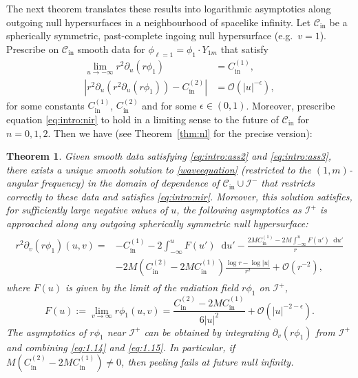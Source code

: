 \documentclass[11pt,english]{article}
\numberwithin{equation}{section}
\newtheorem{thm}{Theorem}[section]
\theoremstyle{remark}
\theoremstyle{plain}
\theoremstyle{remark}
\newcommand{\dd}{\mathop{}\!\mathrm{d}}
\newcommand{\pu}{\partial_u}
\newcommand{\pv}{\partial_v}
\renewcommand{\(}{\left(}
\renewcommand{\)}{\right)}
\newcommand{\cc}{C_{\mathrm{in}}^{(1)}}
\newcommand{\ccc}{C_{\mathrm{in}}^{(2)}}
\newcommand{\pho}{(r\phi_1)}
\begin{document}
The next theorem translates these results into logarithmic asymptotics along outgoing null hypersurfaces in a neighbourhood of spacelike infinity.
Let $\mathcal{C}_{\mathrm{in}}$ be a spherically symmetric, past-complete ingoing null hypersurface (e.g.\ $v=1$). 
Prescribe on $\mathcal{C}_{\mathrm{in}}$ smooth data for $\phi_{\ell=1}=\phi_1 \cdot Y_{1m}$ that satisfy
\begin{align}\label{eq:intro:ass2}
\lim_{u\to-\infty}r^2\pu(r\phi_1)&=\cc,\\
\left|r^2\pu(r^2\pu(r\phi_1))-\ccc\right|&=\mathcal{O}(|u|^{-\epsilon}),\label{eq:intro:ass3}
\end{align}
for some constants $\cc$, $\ccc$ and for some $\epsilon\in(0,1)$. 
Moreover, prescribe equation \eqref{eq:intro:nir} to hold in a limiting sense to the future of $\mathcal C_{\mathrm{in}}$ for $n=0,1,2$.  Then we have (see Theorem~\ref{thm:nl} for the precise version):
	\begin{thm}\label{thm:intro:nl}
	Given smooth data satisfying \eqref{eq:intro:ass2} and \eqref{eq:intro:ass3}, there exists a unique smooth solution to \eqref{waveequation} (restricted to the $(1,m)$-angular frequency) in the domain of dependence of $\mathcal{C}_{\mathrm{in}}\cup \mathcal{I}^-$ that restricts correctly to these data and satisfies \eqref{eq:intro:nir}.
	 Moreover, this solution satisfies, for sufficiently large negative values of $u$, the following asymptotics as $\mathcal{I}^+$ is approached along any outgoing spherically symmetric null hypersurface:
	\begin{align}\label{eq:1.14}
	\begin{split}
	r^2\pv\pho(u,v)=&-\cc-2\int_{-\infty}^uF(u')\dd u'-\frac{2M\cc-2M\int_{-\infty}^uF(u')\dd u'}{r}\\
	&-2M(\ccc-2M\cc)\frac{\log r-\log|u|}{r^2}+\mathcal{O}(r^{-2}),
	\end{split}
	\end{align}
	where $F(u)$ is given by the limit of the radiation field $r\phi_1$ on $\mathcal{I}^+$,
	\begin{equation}\label{eq:1.15}
	F(u):=\lim_{v\to\infty}r\phi_1(u,v)=\frac{\ccc-2M\cc}{6|u|^2}+\mathcal{O}(|u|^{-2-\epsilon}).
	\end{equation}
	The asymptotics of $r\phi_1$ near $\mathcal I^+$ can be obtained by integrating $\pv(r\phi_1)$ from $\mathcal I^+$ and combining \eqref{eq:1.14} and \eqref{eq:1.15}.
	In particular, if $M(\ccc-2M\cc)\neq 0$, then peeling fails at future null infinity.
	\end{thm}
\end{document}
